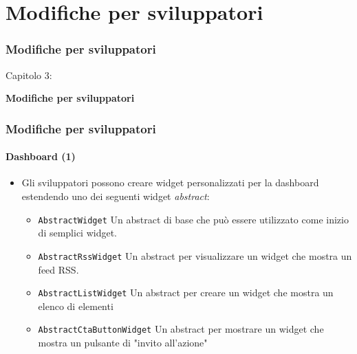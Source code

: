 %

\section{Modifiche per sviluppatori}
\begin{frame}[fragile]
	\frametitle{Modifiche per sviluppatori}

	\begin{center}\huge{Capitolo 3:}\end{center}
	\begin{center}\huge{\color{typo3darkgrey}\textbf{Modifiche per sviluppatori}}\end{center}

\end{frame}


\begin{frame}[fragile]
	\frametitle{Modifiche per sviluppatori}
	\framesubtitle{Dashboard (1)}

	\lstset{basicstyle=\smaller\ttfamily}

	\begin{itemize}
		\item Gli sviluppatori possono creare widget personalizzati per la dashboard estendendo uno dei seguenti widget \textit{abstract}:

			\begin{itemize}
				\item \texttt{AbstractWidget}\newline
					\small
						Un abstract di base che può essere utilizzato come inizio di semplici widget.
					\normalsize
				\item \texttt{AbstractRssWidget}\newline
					\small
						Un abstract per visualizzare un widget che mostra un feed RSS.
					\normalsize
				\item \texttt{AbstractListWidget}\newline
					\small
						Un abstract per creare un widget che mostra un elenco di elementi
					\normalsize
				\item \texttt{AbstractCtaButtonWidget}\newline
					\small
						Un abstract per mostrare un widget che mostra un pulsante di "invito all'azione"
					\normalsize
			\end{itemize}

	\end{itemize}

\end{frame}

